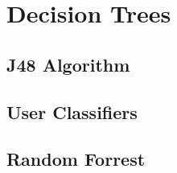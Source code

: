 \section{Decision Trees}
\label{sec:dt}


\subsection{J48 Algorithm}
\label{sec:dt:j48}


\subsection{User Classifiers}
\label{sec:dt:uc}


\subsection{Random Forrest}
\label{sec:dt:rf}